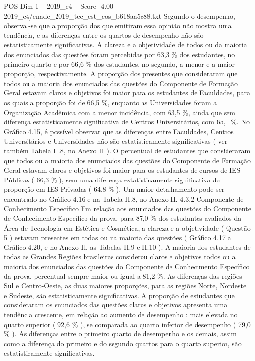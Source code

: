 \begin{textsample}{POS Dim 1 – 2019\_c4 – Score -4.00 – 2019\_c4/enade\_2019\_tec\_est\_cos\_b618aa5e88.txt}
Segundo o desempenho, observa -se que a proporção dos que emitiram essa opinião não mostra uma tendência, e as diferenças entre os quartos de desempenho não são estatisticamente significativas.
A clareza e a objetividade de todos ou da maioria dos enunciados das questões foram percebidas por 63,3 \% dos estudantes, no primeiro quarto e por 66,6 \% dos estudantes, no segundo, a menor e a maior proporção, respectivamente.
A proporção dos presentes que consideraram que todos ou a maioria dos enunciados das questões do Componente de Formação Geral estavam claros e objetivos foi maior para os estudantes de Faculdades, para os quais a proporção foi de 66,5 \%, enquanto as Universidades foram a Organização Acadêmica com a menor incidência, com 63,5 \%, ainda que sem diferença estatisticamente significativa de Centros Universitários, com 65,1 \%.
No Gráfico 4.15, é possível observar que as diferenças entre Faculdades, Centros Universitários e Universidades não são estatisticamente significativas ( ver também Tabela II.8, no Anexo II ).
O percentual de estudantes que consideraram que todos ou a maioria dos enunciados das questões do Componente de Formação Geral estavam claros e objetivos foi maior para os estudantes de cursos de IES Públicas ( 66,3 \% ), sem uma diferença estatisticamente significativa da proporção em IES Privadas ( 64,8 \% ).
Um maior detalhamento pode ser encontrado no Gráfico 4.16 e na Tabela II.8, no Anexo II. 4.3.2 Componente de Conhecimento Específico Em relação aos enunciados das questões do Componente de Conhecimento Específico da prova, para 87,0 \% dos estudantes avaliados da Área de Tecnologia em Estética e Cosmética, a clareza e a objetividade ( Questão 5 ) estavam presentes em todas ou na maioria das questões ( Gráfico 4.17 a Gráfico 4.20, e no Anexo II, as Tabelas II.9 e II.10 ).
A maioria dos estudantes de todas as Grandes Regiões brasileiras considerou claros e objetivos todos ou a maioria dos enunciados das questões do Componente de Conhecimento Específico da prova, percentual sempre maior ou igual a 81,2 \%.
As diferenças das regiões Sul e Centro-Oeste, as duas maiores proporções, para as regiões Norte, Nordeste e Sudeste, são estatisticamente significativas.
A proporção de estudantes que consideraram os enunciados das questões claros e objetivos apresenta uma tendência crescente, em relação ao aumento de desempenho : mais elevada no quarto superior ( 92,6 \% ), se comparada ao quarto inferior de desempenho ( 79,0 \% ).
As diferenças entre o primeiro quarto de desempenho e os demais, assim como a diferença do primeiro e do segundo quartos para o quarto superior, são estatisticamente significativas.

\end{textsample}
